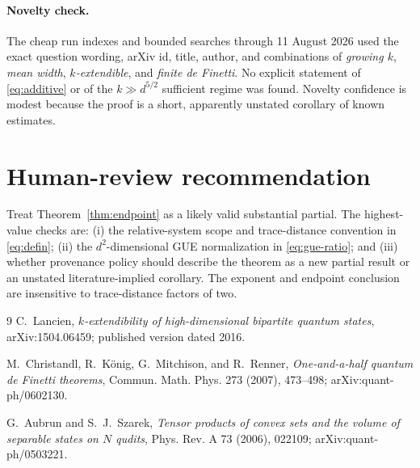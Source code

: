 \documentclass[11pt]{article}
\begin{document}
\paragraph{Novelty check.}
The cheap run indexes and bounded searches through 11 August 2026 used the exact question wording, arXiv id, title, author, and combinations of \emph{growing $k$}, \emph{mean width}, \emph{$k$-extendible}, and \emph{finite de Finetti}.  No explicit statement of \eqref{eq:additive} or of the $k\gg d^{5/2}$ sufficient regime was found.  Novelty confidence is modest because the proof is a short, apparently unstated corollary of known estimates.

\section*{Human-review recommendation}

Treat Theorem~\ref{thm:endpoint} as a likely valid substantial partial.  The highest-value checks are: (i) the relative-system scope and trace-distance convention in \eqref{eq:defin}; (ii) the $d^2$-dimensional GUE normalization in \eqref{eq:gue-ratio}; and (iii) whether provenance policy should describe the theorem as a new partial result or an unstated literature-implied corollary.  The exponent and endpoint conclusion are insensitive to trace-distance factors of two.

\begin{thebibliography}{9}
C.~Lancien,
\emph{$k$-extendibility of high-dimensional bipartite quantum states},
arXiv:1504.06459; published version dated 2016.

M.~Christandl, R.~K\"onig, G.~Mitchison, and R.~Renner,
\emph{One-and-a-half quantum de Finetti theorems},
Commun. Math. Phys. 273 (2007), 473--498;
arXiv:quant-ph/0602130.

G.~Aubrun and S.~J.~Szarek,
\emph{Tensor products of convex sets and the volume of separable states on $N$ qudits},
Phys. Rev. A 73 (2006), 022109;
arXiv:quant-ph/0503221.
\end{thebibliography}
\end{document}
